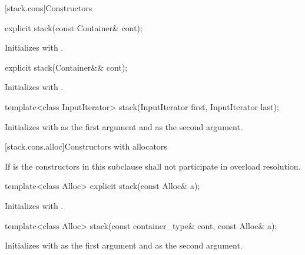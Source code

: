 [stack.cons]{Constructors}

%
\begin{itemdecl}
explicit stack(const Container& cont);
\end{itemdecl}

\begin{itemdescr}
\pnum
\effects
Initializes  with .
\end{itemdescr}

%
\begin{itemdecl}
explicit stack(Container&& cont);
\end{itemdecl}

\begin{itemdescr}
\pnum
\effects
Initializes  with .
\end{itemdescr}

%
\begin{itemdecl}
template<class InputIterator>
  stack(InputIterator first, InputIterator last);
\end{itemdecl}

\begin{itemdescr}
\pnum
\effects
Initializes  with
 as the first argument and  as the second argument.
\end{itemdescr}

[stack.cons.alloc]{Constructors with allocators}

\pnum
If  is 
the constructors in this subclause shall not participate in overload resolution.

%
\begin{itemdecl}
template<class Alloc> explicit stack(const Alloc& a);
\end{itemdecl}

\begin{itemdescr}
\pnum
\effects
Initializes  with .
\end{itemdescr}

%
\begin{itemdecl}
template<class Alloc> stack(const container_type& cont, const Alloc& a);
\end{itemdecl}

\begin{itemdescr}
\pnum
\effects
Initializes  with  as the first argument and  as the
second argument.
\end{itemdescr}

